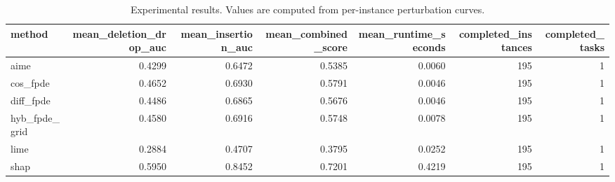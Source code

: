 \begin{table}[t]
\caption{Experimental results. Values are computed from per-instance perturbation curves.}
\label{tab:main_results_computed}
\centering
\begin{tabular}{lrrrrrr}
\toprule
method & mean\_deletion\_drop\_auc & mean\_insertion\_auc & mean\_combined\_score & mean\_runtime\_seconds & completed\_instances & completed\_tasks \\
\midrule
aime & 0.4299 & 0.6472 & 0.5385 & 0.0060 & 195 & 1 \\
cos\_fpde & 0.4652 & 0.6930 & 0.5791 & 0.0046 & 195 & 1 \\
diff\_fpde & 0.4486 & 0.6865 & 0.5676 & 0.0046 & 195 & 1 \\
hyb\_fpde\_grid & 0.4580 & 0.6916 & 0.5748 & 0.0078 & 195 & 1 \\
lime & 0.2884 & 0.4707 & 0.3795 & 0.0252 & 195 & 1 \\
shap & 0.5950 & 0.8452 & 0.7201 & 0.4219 & 195 & 1 \\
\bottomrule
\end{tabular}

\end{table}
